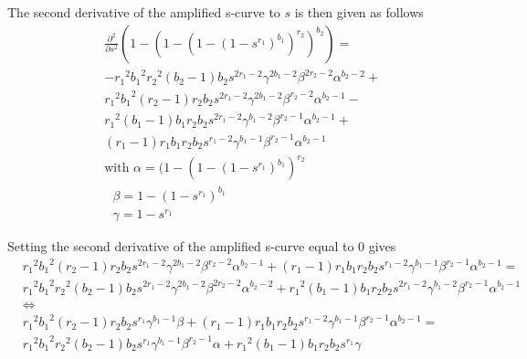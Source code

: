 The second derivative of the amplified s-curve to $s$ is then given as follows
\begin{equation}
    \begin{aligned}
        &\frac{\partial^{2}}{\partial s^{2}}\left(1-\left(1-\left(1-\left(1-s^{r_1}\right)^{b_1}\right)^{r_2}\right)^{b_2}\right)= \\
        &-{r_1}^{2} {b_1}^{2} {r_2}^{2}({b_2}-1) {b_2} s^{2 {r_1}-2}\gamma^{2 {b_1}-2}\beta^{2 {r_2}-2}\alpha^{{b_2}-2}+\\
        &{r_1}^{2} {b_1}^{2}({r_2}-1) {r_2} {b_2} s^{2 {r_1}-2}\gamma^{2 {b_1}-2}\beta^{{r_2}-2}\alpha^{{b_2}-1}-\\
        &{r_1}^{2}({b_1}-1) {b_1} {r_2} {b_2} s^{2 {r_1}-2}\gamma^{{b_1}-2}\beta^{{r_2}-1}\alpha^{{b_2}-1}+\\
        &({r_1}-1) {r_1} {b_1} {r_2} {b_2} s^{{r_1}-2}\gamma^{{b_1}-1}\beta^{{r_2}-1}\alpha^{{b_2}-1} \\
        &\text{with } \alpha = (1 - (1- (1 - s^{r_1})^{b_1})^{r_2} \\
        &\text{     } \beta = 1- (1 - s^{r_1})^{b_1}\\
        &\text{     } \gamma = 1 - s^{r_1}
    \end{aligned}
\end{equation}

Setting the second derivative of the amplified s-curve equal to $0$ gives
\begin{equation}
    \begin{aligned}
        &{r_1}^{2} {b_1}^{2}({r_2}-1) {r_2} {b_2} s^{2 {r_1}-2}\gamma^{2 {b_1}-2}\beta^{{r_2}-2}\alpha^{{b_2}-1} + ({r_1}-1) {r_1} {b_1} {r_2} {b_2} s^{{r_1}-2}\gamma^{{b_1}-1}\beta^{{r_2}-1}\alpha^{{b_2}-1}  = \\
        &{r_1}^{2} {b_1}^{2} {r_2}^{2}({b_2}-1) {b_2} s^{2 {r_1}-2}\gamma^{2 {b_1}-2}\beta^{2 {r_2}-2}\alpha^{{b_2}-2} + {r_1}^{2}({b_1}-1) {b_1} {r_2} {b_2} s^{2 {r_1}-2}\gamma^{{b_1}-2}\beta^{{r_2}-1}\alpha^{{b_2}-1} \\ 
        &\Leftrightarrow\\
        & {r_1}^{2} {b_1}^{2}({r_2}-1) {r_2} {b_2} s^{r_1}\gamma^{{b_1}-1}\beta + ({r_1}-1) {r_1} {b_1} {r_2} {b_2} s^{{r_1}-2}\gamma^{{b_1}-1}\beta^{{r_2}-1}\alpha^{{b_2}-1} = \\
        & {r_1}^{2} {b_1}^{2} {r_2}^{2}({b_2}-1) {b_2} s^{r_1}\gamma^{{b_1}-1}\beta^{{r_2}-1}\alpha + {r_1}^{2}({b_1}-1) {b_1} {r_2} {b_2} s^{r_1}\gamma 
    \end{aligned}
\end{equation}

